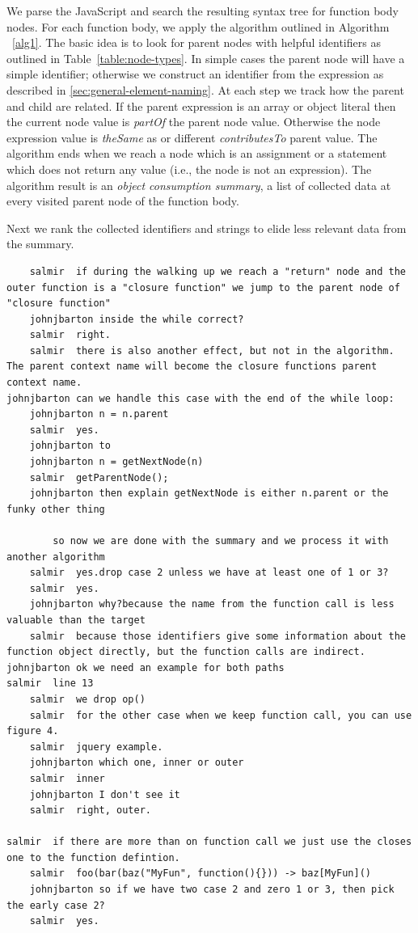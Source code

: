 \documentclass[10pt, preprint]{sigplanconf}
\begin{document}
{We parse the JavaScript and search the resulting syntax tree for function body nodes. For each function body, we apply the algorithm outlined in Algorithm ~\ref{alg1}. The basic idea is to look for parent nodes with helpful identifiers as outlined in  Table~\ref{table:node-types}. In simple cases the parent node will have a simple identifier; otherwise we construct an identifier from the expression as described in \ref{sec:general-element-naming}.  At each step we track how the parent and child are related.  If the parent expression is an array or object literal then the current node value is \textit{partOf} the parent node value. Otherwise the node expression value is \textit{theSame} as or different \textit{contributesTo} parent value. The algorithm ends when we reach a node which is an assignment or a statement which does not return any value (i.e., the node is not an expression).  The algorithm result is an \textit{object consumption summary}, a list of collected data at every visited parent node of the function body.

Next we rank the collected identifiers and strings to elide less relevant data from the summary. 
\begin{verbatim}
	salmir	if during the walking up we reach a "return" node and the outer function is a "closure function" we jump to the parent node of "closure function"
	johnjbarton	inside the while correct?
	salmir	right.
	salmir	there is also another effect, but not in the algorithm. The parent context name will become the closure functions parent context name.
johnjbarton	can we handle this case with the end of the while loop:
	johnjbarton	n = n.parent
	salmir	yes.
	johnjbarton	to
	johnjbarton	n = getNextNode(n)
	salmir	getParentNode();
	johnjbarton	then explain getNextNode is either n.parent or the funky other thing

		so now we are done with the summary and we process it with another algorithm
	salmir	yes.drop case 2 unless we have at least one of 1 or 3?
	salmir	yes.
	johnjbarton	why?because the name from the function call is less valuable than the target
	salmir	because those identifiers give some information about the function object directly, but the function calls are indirect.
johnjbarton	ok we need an example for both paths
salmir	line 13
	salmir	we drop op()
	salmir	for the other case when we keep function call, you can use figure 4.
	salmir	jquery example.
	johnjbarton	which one, inner or outer
	salmir	inner
	johnjbarton	I don't see it
	salmir	right, outer.

salmir	if there are more than on function call we just use the closes one to the function defintion.
	salmir	foo(bar(baz("MyFun", function(){})) -> baz[MyFun]()
	johnjbarton	so if we have two case 2 and zero 1 or 3, then pick the early case 2?
	salmir	yes.


\end{verbatim}}
\end{document}
